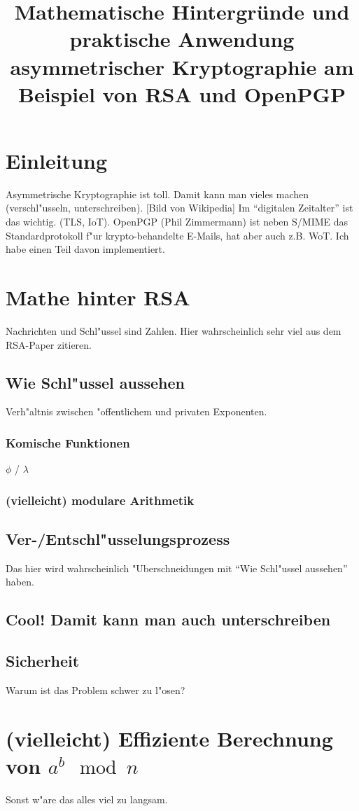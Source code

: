 \documentclass[12pt]{article}
\title{Mathematische Hintergr\"unde und praktische Anwendung asymmetrischer Kryptographie am Beispiel von RSA und OpenPGP}
\begin{document}
\maketitle
\thispagestyle{empty}
\newpage
\tableofcontents
\newpage

\section{Einleitung}
Asymmetrische Kryptographie ist toll. Damit kann man vieles machen (verschl"usseln, unterschreiben). [Bild von Wikipedia] Im "`digitalen Zeitalter"' ist das wichtig. (TLS, IoT). OpenPGP (Phil Zimmermann) ist neben S/MIME das Standardprotokoll f"ur krypto-behandelte E-Mails, hat aber auch z.B. WoT. Ich habe einen Teil davon implementiert.

\section{Mathe hinter RSA}
Nachrichten und Schl"ussel sind Zahlen.
Hier wahrscheinlich sehr viel aus dem RSA-Paper zitieren.
\subsection{Wie Schl"ussel aussehen}
Verh"altnis zwischen "offentlichem und privaten Exponenten.
\subsubsection{Komische Funktionen}
$\phi$ / $\lambda$
\subsubsection{(vielleicht) modulare Arithmetik}
\subsection{Ver-/Entschl"usselungsprozess}
Das hier wird wahrscheinlich "Uberschneidungen mit "`Wie Schl"ussel aussehen"' haben.
\subsection{Cool! Damit kann man auch unterschreiben}
\subsection{Sicherheit}
Warum ist das Problem schwer zu l"osen?

\section{(vielleicht) Effiziente Berechnung von $a^b \mod n$}
Sonst w"are das alles viel zu langsam.
\end{document}
